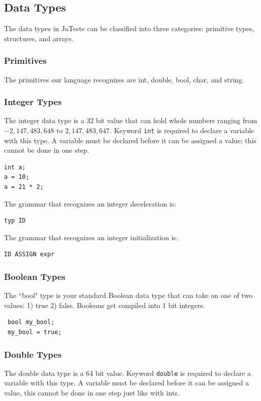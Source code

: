 \documentclass{article}
\begin{document}
\subsection{Data Types}
The data types in JaTeste can be classified into three categories: primitive types, structures, and arrays. 

\subsubsection{Primitives}
The primitives our language recognizes are int, double, bool, char, and string. 

\subsubsection{Integer Types}
The integer data type is a 32 bit value that can hold whole numbers ranging from $-2,147,483,648 \text{ to } 2,147,483,647$. Keyword \texttt{int} is required to declare a variable with this type.  A variable must be declared before it can be assigned a value; this cannot be done in one step. 

\begin{lstlisting}
int a;
a = 10;
a = 21 * 2;
\end{lstlisting}

The grammar that recognizes an integer deceleration is: 
\begin{Verbatim}[frame=single]
typ ID
\end{Verbatim}

The grammar that recognizes an integer initialization is: 
\begin{Verbatim}[frame=single]
ID ASSIGN expr
\end{Verbatim}

\subsubsection{Boolean Types}
The ``bool" type is your standard Boolean data type that can take on one of two values: 1) true 2) false. Booleans get compiled into 1 bit integers.

\begin{lstlisting}
 bool my_bool;
 my_bool = true;
\end{lstlisting}

\subsubsection{Double Types}
The double data type is a 64 bit value.  Keyword \texttt{double} is required to declare a variable with this type.  A variable must be declared before it can be assigned a value, this cannot be done in one step just like with ints.
\end{document}
